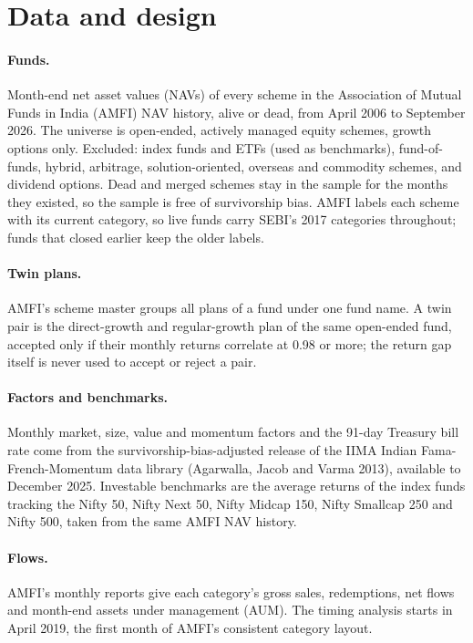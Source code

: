 \documentclass[11pt]{article}
\begin{document}
\section{Data and design}\label{sec:data}
\paragraph{Funds.} Month-end net asset values (NAVs) of every scheme in the Association of Mutual Funds in India (AMFI) NAV history, alive or dead, from April 2006 to September 2026. The universe is open-ended, actively managed equity schemes, growth options only. Excluded: index funds and ETFs (used as benchmarks), fund-of-funds, hybrid, arbitrage, solution-oriented, overseas and commodity schemes, and dividend options. Dead and merged schemes stay in the sample for the months they existed, so the sample is free of survivorship bias. AMFI labels each scheme with its current category, so live funds carry SEBI's 2017 categories throughout; funds that closed earlier keep the older labels.

\paragraph{Twin plans.} AMFI's scheme master groups all plans of a fund under one fund name. A twin pair is the direct-growth and regular-growth plan of the same open-ended fund, accepted only if their monthly returns correlate at 0.98 or more; the return gap itself is never used to accept or reject a pair.

\paragraph{Factors and benchmarks.} Monthly market, size, value and momentum factors and the 91-day Treasury bill rate come from the survivorship-bias-adjusted release of the IIMA Indian Fama-French-Momentum data library (Agarwalla, Jacob and Varma 2013), available to December 2025. Investable benchmarks are the average returns of the index funds tracking the Nifty 50, Nifty Next 50, Nifty Midcap 150, Nifty Smallcap 250 and Nifty 500, taken from the same AMFI NAV history.

\paragraph{Flows.} AMFI's monthly reports give each category's gross sales, redemptions, net flows and month-end assets under management (AUM). The timing analysis starts in April 2019, the first month of AMFI's consistent category layout.
\end{document}
